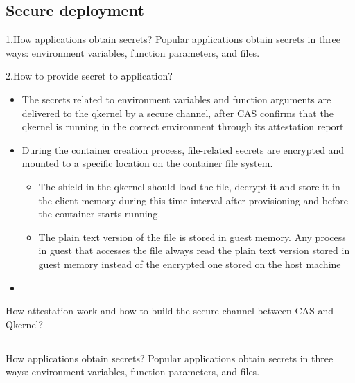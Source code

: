 \subsection{Secure deployment}

1.How applications obtain secrets?
Popular applications obtain secrets in three ways: environment variables, function parameters, and files.

2.How to provide secret to application?
\begin{itemize}
    \item  The secrets related to environment variables and function arguments are  delivered to the qkernel by a secure channel, after CAS confirms that the qkernel is running in the correct environment through its attestation report
    \item  During the container creation process, file-related secrets are encrypted and mounted to a specific location on the container file system.
    \begin{itemize}
        \item The shield in the qkernel should load the file, decrypt it and store it in the client memory during this time interval after provisioning and before the container starts running.
        \item The plain text version of the file is stored in guest memory. Any process in guest that accesses the file always read the plain text version stored in guest memory instead of the encrypted one stored on the host machine
      \end{itemize}
    \item
\end{itemize}

How attestation work and how to build the secure channel between CAS and Qkernel?


\subsection{}

How applications obtain secrets?
Popular applications obtain secrets in three ways: environment variables, function parameters, and files.

